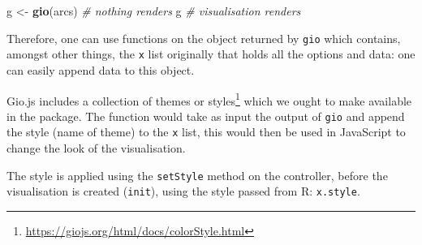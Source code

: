 \documentclass[
]{krantz}
\makeatletter
\newenvironment{Shaded}{\begin{snugshade}}{\end{snugshade}}
\newcommand{\CommentTok}[1]{\textcolor[rgb]{0.37,0.37,0.37}{\textit{#1}}}
\newcommand{\ControlFlowTok}[1]{\textcolor[rgb]{0.27,0.27,0.27}{\textbf{#1}}}
\newcommand{\DataTypeTok}[1]{\textcolor[rgb]{0.27,0.27,0.27}{#1}}
\newcommand{\KeywordTok}[1]{\textcolor[rgb]{0.27,0.27,0.27}{\textbf{#1}}}
\newcommand{\NormalTok}[1]{#1}
\newcommand{\OperatorTok}[1]{\textcolor[rgb]{0.43,0.43,0.43}{\textbf{#1}}}
\newcommand{\StringTok}[1]{\textcolor[rgb]{0.5,0.5,0.5}{#1}}
\renewcommand{\href}[2]{#2\footnote{\url{#1}}}
\newenvironment{kframe}{%
\medskip{}
\setlength{\fboxsep}{.8em}
 \def\at@end@of@kframe{}%
 \ifinner\ifhmode%
  \def\at@end@of@kframe{\end{minipage}}%
  \begin{minipage}{\columnwidth}%
 \fi\fi%
 \def\FrameCommand##1{\hskip\@totalleftmargin \hskip-\fboxsep
 \colorbox{shadecolor}{##1}\hskip-\fboxsep
     \hskip-\linewidth \hskip-\@totalleftmargin \hskip\columnwidth}%
 \MakeFramed {\advance\hsize-\width
   \@totalleftmargin\z@ \linewidth\hsize
   \@setminipage}}%
 {\par\unskip\endMakeFramed%
 \at@end@of@kframe}
\renewenvironment{Shaded}{\begin{kframe}}{\end{kframe}}
\makeatother
\begin{document}
\begin{Shaded}
\begin{Highlighting}[]
\NormalTok{g <{-}}\StringTok{ }\KeywordTok{gio}\NormalTok{(arcs) }\CommentTok{\# nothing renders}
\NormalTok{g }\CommentTok{\# visualisation renders}
\end{Highlighting}
\end{Shaded}

Therefore, one can use functions on the object returned by \texttt{gio} which contains, amongst other things, the \texttt{x} list originally that holds all the options and data: one can easily append data to this object.

\begin{Shaded}
\end{Shaded}

Gio.js includes a collection of themes or \href{https://giojs.org/html/docs/colorStyle.html}{styles} which we ought to make available in the package. The function would take as input the output of \texttt{gio} and append the style (name of theme) to the \texttt{x} list, this would then be used in JavaScript to change the look of the visualisation.

\begin{Shaded}
\end{Shaded}

The style is applied using the \texttt{setStyle} method on the controller, before the visualisation is created (\texttt{init}), using the style passed from R: \texttt{x.style}.
\end{document}
